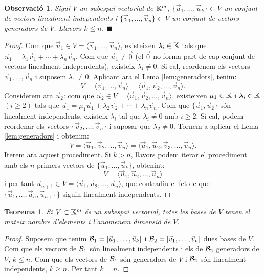 \documentclass[
  11pt,
]{book}
\numberwithin{dummy}{section}
\theoremstyle{maincolornumbox}
\newtheorem{theorem}{TTTT}[chapter]
\newtheorem{theoremeT}{Teorema}[chapter]
\newtheorem{remarkT}{Observació}[chapter]
\theoremstyle{blacknumex}
\theoremstyle{blacknumbox}
\theoremstyle{maincolornum}
\renewenvironment{theorem}{\begin{tBox}\begin{theoremeT}}{\end{theoremeT}\end{tBox}}
\newenvironment{remark}{\begin{remarkT}}{\hfill{\tiny\ensuremath{\blacksquare}}\end{remarkT}}
\newlength\esp
\begin{document}
\begin{remark}
Sigui \(V\) un subespai vectorial de \(\mathbb{K}^m\),
\(\{\vec u_1,\dots,\vec u_k\}\subset V\) un conjunt de vectors linealment
independents i \(\{\vec v_1,\dots,\vec v_n\}\subset V\) un conjunt de
vectors generadors de \(V\). Llavors \(k\leq n\).
\end{remark}

\begin{proof}
Com que
\(\vec u_1\in V=\langle \vec v_1,\dots,\vec v_n \rangle\), existeixen
\(\lambda_i\in\mathbb{K}\) tals que
\(\vec u_1=\lambda_1 \vec v_1+\cdots+\lambda_n\vec v_n\). Com que
\(\vec u_1 \neq\vec 0\) (el \(\vec 0\) no forma part de cap conjunt de
vectors linealment independents), existeix \(\lambda_i\neq 0\). Si cal,
reordenem els vectors \(\vec v_1,\dots,\vec v_n\) i suposem
\(\lambda_1\neq 0\). Aplicant ara el Lema
\ref{lem:generadors}, tenim:
\[V=\langle \vec v_1,\dots,\vec v_n \rangle=\langle \vec u_1,\vec v_2,\dots,\vec v_n \rangle .\]
Considerem ara \(\vec u_2\): com que
\(\vec u_2\in V=\langle \vec u_1,\vec v_2,\dots,\vec v_n \rangle\),
existeixen \(\mu_1\in\mathbb{K}\) i \(\lambda_i\in\mathbb{K}\) \((i\geq 2)\) tals que
\(\vec u_1=\mu_1\vec u_1+\lambda_2\vec v_2+\cdots+\lambda_n\vec v_n\). Com
que \(\{\vec u_1,\vec u_2\}\) són linealment independents, existeix
\(\lambda_i\) tal que \(\lambda_i\neq 0\) amb \(i\geq 2\). Si cal, podem
reordenar els vectors \(\{\vec v_2,\dots,\vec v_n\}\) i suposar que
\(\lambda_2\neq 0\). Tornem a aplicar el Lema
\ref{lem:generadors} i obtenim:
\[V=\langle \vec u_1,\vec v_2,\dots,\vec v_{n} \rangle=\langle \vec u_1,\vec u_2,\vec v_3,\dots,\vec v_{n} \rangle .\]
Iterem ara aquest procediment. Si \(k>n\), llavors podem iterar el
procediment amb els \(n\) primers vectors de
\(\{\vec u_1,\dots,\vec u_k\}\), obtenint:
\[V=\langle \vec u_1,\vec u_2,\dots,\vec u_{n} \rangle\] i per tant
\(\vec u_{n+1} \in V=\langle \vec u_1,\vec u_2,\dots,\vec u_{n} \rangle\),
que contradiu el fet de que \(\{\vec u_1, \dots, \vec u_n,\vec u_{n+1}\}\)
siguin linealment independents.
\end{proof}

\begin{theorem}
\protect\hypertarget{thm:bases-igual-cardinalitat}{}\label{thm:bases-igual-cardinalitat}Si \(V\subset \mathbb{K}^m\) és un subespai vectorial, totes les bases de \(V\)
tenen el mateix nombre d'elements i l'anomenem \emph{dimensió de \(V\)}.
\end{theorem}

\begin{proof}
Suposem que tenim \(\mathcal{B}_1=[\vec u_1,\dots,\vec u_k]\) i
\(\mathcal{B}_2=[\vec v_1,\dots,\vec v_n]\) dues bases de \(V\). Com que els
vectors de \(\mathcal{B}_1\) són linealment independents i els de \(\mathcal{B}_2\)
generadors de \(V\), \(k\leq n\). Com que els vectors de \(\mathcal{B}_1\) són
generadors de \(V\) i \(\mathcal{B}_2\) són linealment independents, \(k\geq n\).
Per tant \(k=n\).
\end{proof}
\end{document}
